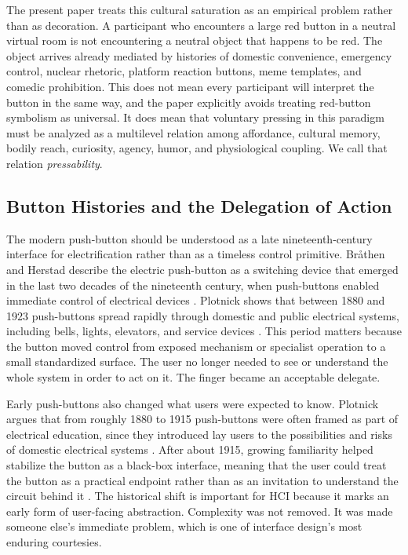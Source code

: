 The present paper treats this cultural saturation as an empirical problem rather than as decoration. A participant who encounters a large red button in a neutral virtual room is not encountering a neutral object that happens to be red. The object arrives already mediated by histories of domestic convenience, emergency control, nuclear rhetoric, platform reaction buttons, meme templates, and comedic prohibition. This does not mean every participant will interpret the button in the same way, and the paper explicitly avoids treating red-button symbolism as universal. It does mean that voluntary pressing in this paradigm must be analyzed as a multilevel relation among affordance, cultural memory, bodily reach, curiosity, agency, humor, and physiological coupling. We call that relation \emph{pressability}.

\subsection{Button Histories and the Delegation of Action}

The modern push-button should be understood as a late nineteenth-century interface for electrification rather than as a timeless control primitive. Br{\aa}then and Herstad describe the electric push-button as a switching device that emerged in the last two decades of the nineteenth century, when push-buttons enabled immediate control of electrical devices \citep{BrathenHerstad2023Pushbutton}. Plotnick shows that between 1880 and 1923 push-buttons spread rapidly through domestic and public electrical systems, including bells, lights, elevators, and service devices \citep{PlotnickInterface2012}. This period matters because the button moved control from exposed mechanism or specialist operation to a small standardized surface. The user no longer needed to see or understand the whole system in order to act on it. The finger became an acceptable delegate.

Early push-buttons also changed what users were expected to know. Plotnick argues that from roughly 1880 to 1915 push-buttons were often framed as part of electrical education, since they introduced lay users to the possibilities and risks of domestic electrical systems \citep{PlotnickInterface2012}. After about 1915, growing familiarity helped stabilize the button as a black-box interface, meaning that the user could treat the button as a practical endpoint rather than as an invitation to understand the circuit behind it \citep{PlotnickInterface2012}. The historical shift is important for HCI because it marks an early form of user-facing abstraction. Complexity was not removed. It was made someone else's immediate problem, which is one of interface design's most enduring courtesies.

